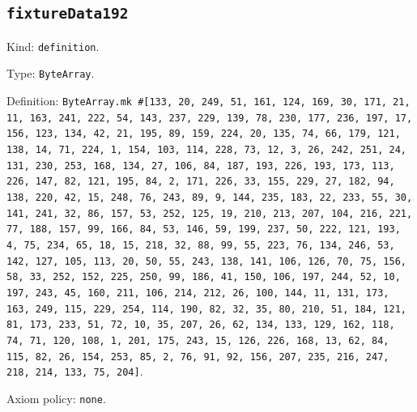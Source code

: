 \documentclass[11pt]{article}
\begin{document}
\subsection*{\texttt{fixtureData192}}
\noindent Kind: \texttt{definition}.\par
\noindent Type: \texttt{ByteArray}.\par
\noindent Definition: \texttt{ByteArray.mk \#[133, 20, 249, 51, 161, 124, 169, 30, 171, 21, 11, 163, 241, 222, 54, 143, 237, 229, 139, 78, 230, 177, 236, 197, 17, 156, 123, 134, 42, 21, 195, 89, 159, 224, 20, 135, 74, 66, 179, 121, 138, 14, 71, 224, 1, 154, 103, 114, 228, 73, 12, 3, 26, 242, 251, 24, 131, 230, 253, 168, 134, 27, 106, 84, 187, 193, 226, 193, 173, 113, 226, 147, 82, 121, 195, 84, 2, 171, 226, 33, 155, 229, 27, 182, 94, 138, 220, 42, 15, 248, 76, 243, 89, 9, 144, 235, 183, 22, 233, 55, 30, 141, 241, 32, 86, 157, 53, 252, 125, 19, 210, 213, 207, 104, 216, 221, 77, 188, 157, 99, 166, 84, 53, 146, 59, 199, 237, 50, 222, 121, 193, 4, 75, 234, 65, 18, 15, 218, 32, 88, 99, 55, 223, 76, 134, 246, 53, 142, 127, 105, 113, 20, 50, 55, 243, 138, 141, 106, 126, 70, 75, 156, 58, 33, 252, 152, 225, 250, 99, 186, 41, 150, 106, 197, 244, 52, 10, 197, 243, 45, 160, 211, 106, 214, 212, 26, 100, 144, 11, 131, 173, 163, 249, 115, 229, 254, 114, 190, 82, 32, 35, 80, 210, 51, 184, 121, 81, 173, 233, 51, 72, 10, 35, 207, 26, 62, 134, 133, 129, 162, 118, 74, 71, 120, 108, 1, 201, 175, 243, 15, 126, 226, 168, 13, 62, 84, 115, 82, 26, 154, 253, 85, 2, 76, 91, 92, 156, 207, 235, 216, 247, 218, 214, 133, 75, 204]}.\par
\noindent Axiom policy: \texttt{none}.\par
\end{document}
